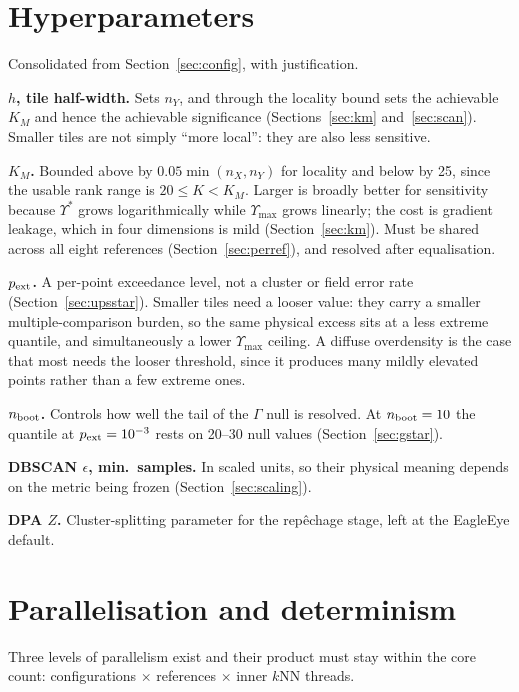 \documentclass[11pt,a4paper]{article}
\newcommand{\Ups}{\Upsilon}                  %
\newcommand{\Gam}{\Gamma}                    %
\newcommand{\Ups}{\Upsilon}
\newcommand{\Gam}{\Gamma}
\begin{document}
\appendix
\section{Hyperparameters}
\label{app:hyper}

Consolidated from Section~\ref{sec:config}, with justification.

\textbf{$h$, tile half-width.} Sets $n_Y$, and through the locality bound sets the achievable $K_M$
and hence the achievable significance (Sections~\ref{sec:km} and~\ref{sec:scan}). Smaller tiles are
not simply ``more local'': they are also less sensitive.

\textbf{$K_M$.} Bounded above by $0.05\min(n_X, n_Y)$ for locality and below by 25, since the
usable rank range is $20 \le K < K_M$. Larger is broadly better for sensitivity because $\Ups^*$
grows logarithmically while $\Ups_{\max}$ grows linearly; the cost is gradient leakage, which in
four dimensions is mild (Section~\ref{sec:km}). Must be shared across all eight references
(Section~\ref{sec:perref}), and resolved after equalisation.

\textbf{$p_{\rm ext}$.} A per-point exceedance level, not a cluster or field error rate
(Section~\ref{sec:upsstar}). Smaller tiles need a looser value: they carry a smaller
multiple-comparison burden, so the same physical excess sits at a less extreme quantile, and
simultaneously a lower $\Ups_{\max}$ ceiling. A diffuse overdensity is the case that most needs the
looser threshold, since it produces many mildly elevated points rather than a few extreme ones.

\textbf{$n_{\rm boot}$.} Controls how well the tail of the $\Gam$ null is resolved. At
$n_{\rm boot} = 10$ the quantile at $p_{\rm ext} = 10^{-3}$ rests on 20--30 null values
(Section~\ref{sec:gstar}).

\textbf{DBSCAN $\epsilon$, min.\ samples.} In scaled units, so their physical meaning depends on the
metric being frozen (Section~\ref{sec:scaling}).

\textbf{DPA $Z$.} Cluster-splitting parameter for the rep\^echage stage, left at the EagleEye
default.

\section{Parallelisation and determinism}
\label{app:parallel}

Three levels of parallelism exist and their product must stay within the core count:
configurations $\times$ references $\times$ inner $k$NN threads.
\end{document}
